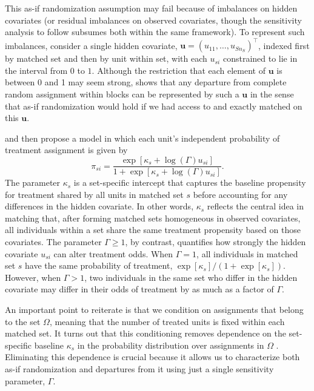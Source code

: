 \documentclass[
  12pt,
  leqno]{article}
\begin{document}
This as-if randomization assumption may fail because of imbalances on
hidden covariates (or residual imbalances on observed covariates, though
the sensitivity analysis to follow subsumes both within the same
framework). To represent such imbalances, consider a single hidden
covariate, \(\bm{u} = (u_{11}, \ldots , u_{Sn_S})^{\top}\), indexed
first by matched set and then by unit within set, with each \(u_{si}\)
constrained to lie in the interval from \(0\) to \(1\). Although the
restriction that each element of \(\bm{u}\) is between 0 and 1 may seem
strong, \citet[p.~300, fn. 33]{rosenbaum2017} shows that any departure
from complete random assignment within blocks can be represented by such
a \(\bm{u}\) in the sense that as-if randomization would hold if we had
access to and exactly matched on this \(\bm{u}\).

\citet{rosenbaum1987a} and \citet{rosenbaumkrieger1990} then propose a
model in which each unit's independent probability of treatment
assignment is given by \begin{equation}
\label{eq: indiv sens prob}
\pi_{si} = \frac{\exp\left[\kappa_s + \log(\Gamma) u_{si}\right]}{1 + \exp\left[\kappa_s + \log(\Gamma) u_{si}\right]}.
\end{equation} The parameter \(\kappa_s\) is a set-specific intercept
that captures the baseline propensity for treatment shared by all units
in matched set \(s\) before accounting for any differences in the hidden
covariate. In other words, \(\kappa_s\) reflects the central idea in
matching that, after forming matched sets homogeneous in observed
covariates, all individuals within a set share the same treatment
propensity based on those covariates. The parameter \(\Gamma \geq 1\),
by contrast, quantifies how strongly the hidden covariate \(u_{si}\) can
alter treatment odds. When \(\Gamma = 1\), all individuals in matched
set \(s\) have the same probability of treatment,
\(\exp[\kappa_s] / (1 + \exp[\kappa_s])\). However, when \(\Gamma > 1\),
two individuals in the same set who differ in the hidden covariate may
differ in their odds of treatment by as much as a factor of \(\Gamma\).

An important point to reiterate is that we condition on assignments that
belong to the set \(\Omega\), meaning that the number of treated units
is fixed within each matched set. It turns out that this conditioning
removes dependence on the set-specific baseline \(\kappa_s\) in the
probability distribution over assignments in \(\Omega\)
\citep{rosenbaum1984}. Eliminating this dependence is crucial because it
allows us to characterize both as-if randomization and departures from
it using just a single sensitivity parameter, \(\Gamma\).
\end{document}
